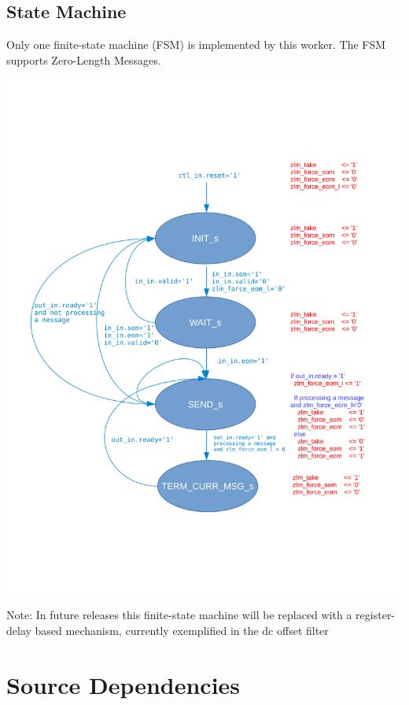\subsection*{State Machine}
	\begin{flushleft}
		Only one finite-state machine (FSM) is implemented by this worker. The FSM supports Zero-Length Messages.
	\end{flushleft}
	{\centering\captionsetup{type=figure}\includegraphics[scale=0.45]{complex_mixer_zlm_fsm}
	\label{fig:zlm_fsm}}
        \begin{flushleft}
                Note: In future releases this finite-state machine will be replaced with a register-delay based mechanism, currently exemplified in the dc offset filter
        \end{flushleft}

\newpage
\section*{Source Dependencies}
